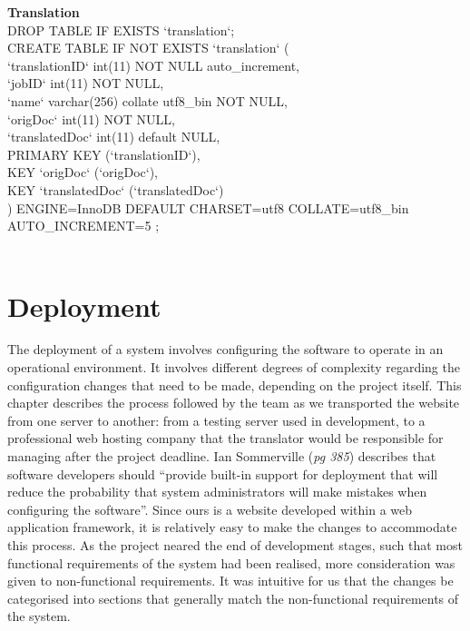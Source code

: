 \documentclass{l3proj}
\begin{document}
{\textbf{Translation}
\\
DROP TABLE IF EXISTS `translation`;\\
CREATE TABLE IF NOT EXISTS `translation` (\\
  `translationID` int(11) NOT NULL auto\_increment,\\
  `jobID` int(11) NOT NULL,\\
  `name` varchar(256) collate utf8\_bin NOT NULL,\\
  `origDoc` int(11) NOT NULL,\\
  `translatedDoc` int(11) default NULL,\\
  PRIMARY KEY  (`translationID`),\\
  KEY `origDoc` (`origDoc`),\\
  KEY `translatedDoc` (`translatedDoc`)\\
) ENGINE=InnoDB  DEFAULT CHARSET=utf8 COLLATE=utf8\_bin AUTO\_INCREMENT=5 ;\\
\\
}

\chapter{Deployment}
\label{chap:depl}
The deployment of a system involves configuring the software to operate in an operational 
environment. It involves different degrees of complexity regarding the configuration
changes that need to be made, depending on the project itself. This chapter describes 
the process followed by the team as we transported the website from one server to another: 
from a testing server used in development, to a professional web hosting company
that the translator would be responsible for managing after the project deadline.\newline
Ian Sommerville \cite{seng} (\textit{pg 385}) describes that software developers 
should ``provide built-in support for deployment that will reduce the probability that system 
administrators will make mistakes when configuring the software''. Since ours is a 
website developed within a web application framework, it is relatively easy to make the
changes to accommodate this process. As the project neared the end of development stages, such
that most functional requirements of the system had been realised, more consideration was given
to non-functional requirements. It was intuitive for us that the changes be categorised 
into sections that generally match the non-functional requirements of the system.
\end{document}
